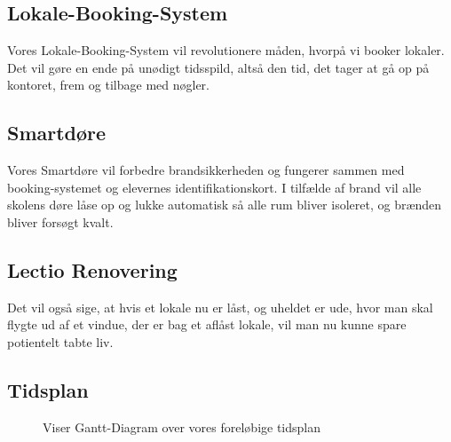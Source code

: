 \documentclass[12pt, a4paper]{article}
\begin{document}
\subsection{Lokale-Booking-System}
    Vores Lokale-Booking-System vil revolutionere måden, hvorpå vi booker lokaler. 
    Det vil gøre en ende på unødigt tidsspild, altså den tid, det tager at gå op på kontoret, frem og tilbage med nøgler.
\subsection{Smartdøre}
    Vores Smartdøre vil forbedre brandsikkerheden og fungerer sammen med booking-systemet og elevernes identifikationskort.
    I tilfælde af brand vil alle skolens døre låse op og lukke automatisk så alle rum bliver isoleret, og brænden bliver forsøgt kvalt. 
\subsection{Lectio Renovering}
    Det vil også sige, at hvis et lokale nu er låst, og uheldet er ude, hvor man skal flygte ud af et vindue, der er bag et aflåst lokale, vil man nu kunne spare potientelt tabte liv.

    \begin{landscape}
\section{Tidsplan}
    \begin{figure}[H]
        \caption{Viser Gantt-Diagram over vores foreløbige tidsplan}
    \end{figure}
\end{landscape}
\end{document}
